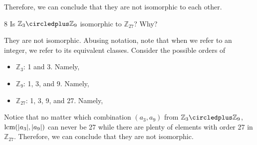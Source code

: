 \begin{hwproblem}
Therefore, we can conclude that they are not isomorphic to each other.
\end{hwproblem}

\begin{hwproblem}
{8}{
    Is \(\mathbb{Z}_3 \circledplus \mathbb{Z}_9\) isomorphic to \(\mathbb{Z}_{27}\)? Why?
}

They are not isomorphic. Abusing notation, note that when we refer to an integer, we refer to its equivalent classes. Consider the possible orders of
\begin{itemize}
    \item \(\mathbb{Z}_3\): 1 and 3. Namely,
    \item \(\mathbb{Z}_9\): 1, 3, and 9. Namely,
    \item \(\mathbb{Z}_{27}\): 1, 3, 9, and 27. Namely,
\end{itemize}
Notice that no matter which combination \((a_3, a_9)\) from \(\mathbb{Z}_3 \circledplus \mathbb{Z}_9\), \(\operatorname{lcm}(|a_3|, |a_9|)\) can never be 27 while there are plenty of elements with order 27 in \(\mathbb{Z}_{27}\). Therefore, we can conclude that they are not isomorphic.
\end{hwproblem}

